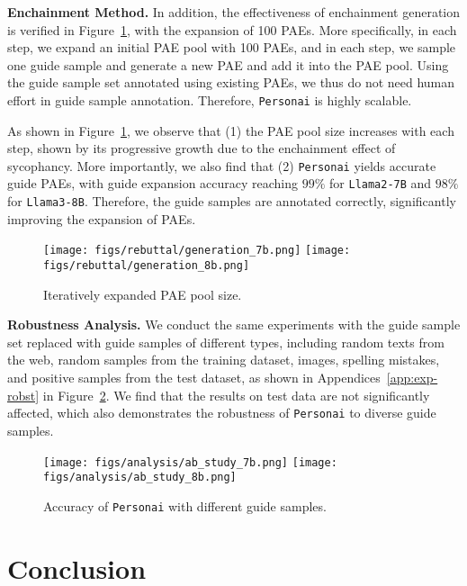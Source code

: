 {\textbf{Enchainment Method.} In addition, the effectiveness of enchainment generation is verified in Figure~\ref{fig:exp-progressive}, with the expansion of 100 PAEs. More specifically, in each step, we expand an initial PAE pool with 100 PAEs, and in each step, we sample one guide sample and generate a new PAE and add it into the PAE pool. Using the guide sample set annotated using existing PAEs, we thus do not need human effort in guide sample annotation. Therefore, \texttt{Personai} is highly scalable. 

As shown in Figure~\ref{fig:exp-progressive}, we observe that (1) the PAE pool size increases with each step, shown by its progressive growth due to the enchainment effect of sycophancy. More importantly, we also find that (2) \texttt{Personai} yields accurate guide PAEs, with guide expansion accuracy reaching $99\%$ for \texttt{Llama2-7B} and $98\%$ for \texttt{Llama3-8B}. Therefore, the guide samples are annotated correctly, significantly improving the expansion of PAEs.

\begin{figure}[!t]
\centering
\texttt{[image: figs/rebuttal/generation\_7b.png]}\!\!\!\!\!
\texttt{[image: figs/rebuttal/generation\_8b.png]}
\caption{Iteratively expanded PAE pool size.}
\label{fig:exp-progressive}
\end{figure}

\textbf{Robustness Analysis.} We conduct the same experiments with the guide sample set replaced with guide samples of different types, including random texts from the web, random samples from the training dataset, images, spelling mistakes, and positive samples from the test dataset, as shown in Appendices~\ref{app:exp-robst} in Figure~\ref{fig:exp-robst}. We find that the results on test data are not significantly affected, which also demonstrates the robustness of \texttt{Personai} to diverse guide samples.

\begin{figure}[!t]
\centering
\texttt{[image: figs/analysis/ab\_study\_7b.png]}\!\!\!
\texttt{[image: figs/analysis/ab\_study\_8b.png]}
\caption{Accuracy of \texttt{Personai} with different guide samples.}
\label{fig:exp-robst}
\end{figure}



\section{Conclusion}

}
